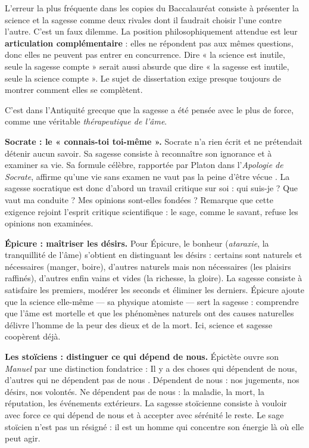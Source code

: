 \documentclass[11pt]{article}
\newcounter{popsec}
\newcounter{popsub}
\newcommand{\courssub}[1]{%
  \stepcounter{popsub}%
  \par\vspace{9pt}\noindent{\popxbold\fontsize{11.5}{13}\selectfont\color{popink}{\color{poporange}\thepopsec.\thepopsub}\hspace{6pt}#1}\par\nopagebreak\vspace{4pt}
}
\begin{document}
\begin{attention}
L'erreur la plus fréquente dans les copies du Baccalauréat consiste à présenter la science et la sagesse comme deux rivales dont il faudrait choisir l'une contre l'autre. C'est un faux dilemme. La position philosophiquement attendue est leur \textbf{articulation complémentaire} : elles ne répondent pas aux mêmes questions, donc elles ne peuvent pas entrer en concurrence. Dire « la science est inutile, seule la sagesse compte » serait aussi absurde que dire « la sagesse est inutile, seule la science compte ». Le sujet de dissertation exige presque toujours de montrer comment elles se complètent.
\end{attention}

\courssub{La sagesse antique : un art de vivre éprouvé}

C'est dans l'Antiquité grecque que la sagesse a été pensée avec le plus de force, comme une véritable \emph{thérapeutique de l'âme}.

\textbf{Socrate : le « connais-toi toi-même ».} Socrate n'a rien écrit et ne prétendait détenir aucun savoir. Sa sagesse consiste à reconnaître son ignorance et à examiner sa vie. Sa formule célèbre, rapportée par Platon dans l'\emph{Apologie de Socrate}, affirme qu'\guillemotleft une vie sans examen ne vaut pas la peine d'être vécue \guillemotright. La sagesse socratique est donc d'abord un travail critique sur soi : qui suis-je ? Que vaut ma conduite ? Mes opinions sont-elles fondées ? Remarque que cette exigence rejoint l'esprit critique scientifique : le sage, comme le savant, refuse les opinions non examinées.

\textbf{Épicure : maîtriser les désirs.} Pour Épicure, le bonheur (\emph{ataraxie}, la tranquillité de l'âme) s'obtient en distinguant les désirs : certains sont naturels et nécessaires (manger, boire), d'autres naturels mais non nécessaires (les plaisirs raffinés), d'autres enfin vains et vides (la richesse, la gloire). La sagesse consiste à satisfaire les premiers, modérer les seconds et éliminer les derniers. Épicure ajoute que la science elle-même — sa physique atomiste — sert la sagesse : comprendre que l'âme est mortelle et que les phénomènes naturels ont des causes naturelles délivre l'homme de la peur des dieux et de la mort. Ici, science et sagesse coopèrent déjà.

\textbf{Les stoïciens : distinguer ce qui dépend de nous.} Épictète ouvre son \emph{Manuel} par une distinction fondatrice : \guillemotleft Il y a des choses qui dépendent de nous, d'autres qui ne dépendent pas de nous \guillemotright. Dépendent de nous : nos jugements, nos désirs, nos volontés. Ne dépendent pas de nous : la maladie, la mort, la réputation, les événements extérieurs. La sagesse stoïcienne consiste à vouloir avec force ce qui dépend de nous et à accepter avec sérénité le reste. Le sage stoïcien n'est pas un résigné : il est un homme qui concentre son énergie là où elle peut agir.
\end{document}
